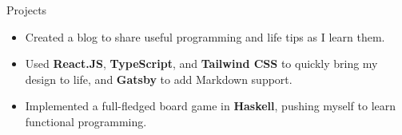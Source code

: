 \documentclass{resume} %
\begin{document}
\begin{workSection}{Projects}
	\customItem[
		title=\href{https://blog.ashkan.zone/}{blog.ashkan.zone \faExternalLink},
		duration=August 2024,
	]
	\begin{itemize}
		\vspace{-0.5em}
		\itemsep -6pt {}
		\item Created a blog to share useful programming and life tips as I learn them.
		\item Used \textbf{React.JS}, \textbf{TypeScript}, and \textbf{Tailwind CSS} to quickly bring my design to life, and \textbf{Gatsby} to add Markdown support.
	\end{itemize}
	
	\customItem[
		title=\href{https://github.com/AshkanArabim/pwaang-extended}{PWAANG - a board game written in Haskell \faExternalLink},
		duration=May 2024,
	]
	\begin{itemize}
		\vspace{-0.5em}
		\itemsep -6pt {}
		\item Implemented a full-fledged board game in \textbf{Haskell}, pushing myself to learn functional programming.
	\end{itemize}
	
	

\end{workSection}
\end{document}
